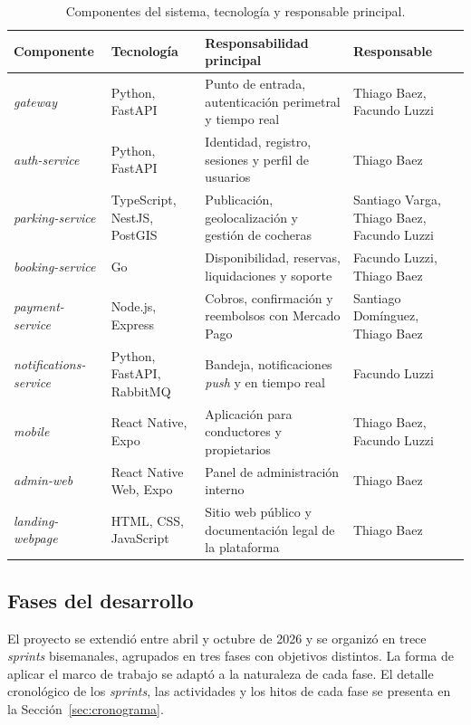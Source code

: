 \begin{table}[H]
\centering
\renewcommand{\arraystretch}{1.4}
\small
\begin{tabularx}{\textwidth}{>{\raggedright\arraybackslash}p{3.1cm} >{\raggedright\arraybackslash}p{3.3cm} >{\raggedright\arraybackslash}X >{\raggedright\arraybackslash}p{2.6cm}}
\toprule
\textbf{Componente} & \textbf{Tecnología} & \textbf{Responsabilidad principal} & \textbf{Responsable} \\
\midrule
\textit{gateway} & Python, FastAPI & Punto de entrada, autenticación perimetral y tiempo real & Thiago Baez, Facundo Luzzi \\
\textit{auth-service} & Python, FastAPI & Identidad, registro, sesiones y perfil de usuarios & Thiago Baez \\
\textit{parking-service} & TypeScript, NestJS, PostGIS & Publicación, geolocalización y gestión de cocheras & Santiago Varga, Thiago Baez, Facundo Luzzi \\
\textit{booking-service} & Go & Disponibilidad, reservas, liquidaciones y soporte & Facundo Luzzi, Thiago Baez \\
\textit{payment-service} & Node.js, Express & Cobros, confirmación y reembolsos con Mercado Pago & Santiago Domínguez, Thiago Baez \\
\textit{notifications-service} & Python, FastAPI, RabbitMQ & Bandeja, notificaciones \textit{push} y en tiempo real & Facundo Luzzi \\
\textit{mobile} & React Native, Expo & Aplicación para conductores y propietarios & Thiago Baez, Facundo Luzzi \\
\textit{admin-web} & React Native Web, Expo & Panel de administración interno & Thiago Baez \\
\textit{landing-webpage} & HTML, CSS, JavaScript & Sitio web público y documentación legal de la plataforma & Thiago Baez \\
\bottomrule
\end{tabularx}
\caption{Componentes del sistema, tecnología y responsable principal.}
\label{tab:microservicios}
\end{table}

\subsection{Fases del desarrollo}\label{sec:fases}

El proyecto se extendió entre abril y octubre de 2026 y se organizó en trece \textit{sprints} bisemanales, agrupados en tres fases con objetivos distintos. La forma de aplicar el marco de trabajo se adaptó a la naturaleza de cada fase. El detalle cronológico de los \textit{sprints}, las actividades y los hitos de cada fase se presenta en la Sección~\ref{sec:cronograma}.

